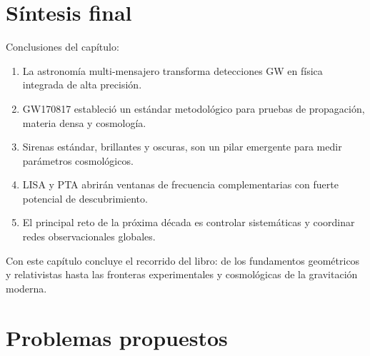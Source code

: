 \section{Síntesis final}
\label{sec:sintesis_cap20}

Conclusiones del capítulo:
\begin{enumerate}[leftmargin=2em, label=\textbf{\arabic*.}]
  \item La astronomía multi-mensajero transforma detecciones GW en física integrada de alta precisión.
  \item GW170817 estableció un estándar metodológico para pruebas de propagación, materia densa y cosmología.
  \item Sirenas estándar, brillantes y oscuras, son un pilar emergente para medir parámetros cosmológicos.
  \item LISA y PTA abrirán ventanas de frecuencia complementarias con fuerte potencial de descubrimiento.
  \item El principal reto de la próxima década es controlar sistemáticas y coordinar redes observacionales globales.
\end{enumerate}

Con este capítulo concluye el recorrido del libro: de los fundamentos geométricos y relativistas hasta las fronteras experimentales y cosmológicas de la gravitación moderna.

\section*{Problemas propuestos}

